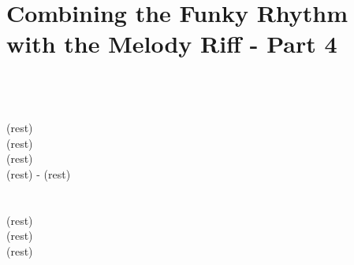         \newpage
    \section{Combining the Funky Rhythm with the Melody Riff - Part 4}
        \spaceInvisDot
        \ffd \ffb \\
        \tfd \tfb \\
        \ottd \ottb \ottd \\  
        (rest) \ottd \ottb \ottd \\    
        (rest) \ottd \ottb \ottd \\    
            (rest) \ottd \ottb \ottd \\    

        \spaceInvisDot
        (rest) - (rest) \ffd \ffb \\
        \tfd \tfb \\
        \ottd \ottb \ottd \\  
        (rest) \ottd \ottb \ottd \\    
        (rest) \ottd \ottb \ottd \\    
            (rest) \ottd \ottb \ottd \\    
    
    \newpage        
